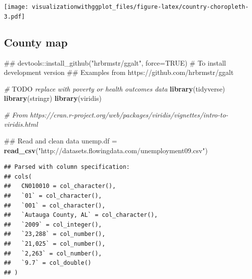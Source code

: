 \documentclass[]{krantz}
\makeatletter
\newenvironment{Shaded}{\begin{snugshade}}{\end{snugshade}}
\newcommand{\KeywordTok}[1]{\textcolor[rgb]{0.13,0.29,0.53}{\textbf{#1}}}
\newcommand{\StringTok}[1]{\textcolor[rgb]{0.31,0.60,0.02}{#1}}
\newcommand{\CommentTok}[1]{\textcolor[rgb]{0.56,0.35,0.01}{\textit{#1}}}
\newcommand{\AlertTok}[1]{\textcolor[rgb]{0.94,0.16,0.16}{#1}}
\newcommand{\NormalTok}[1]{#1}
\newenvironment{kframe}{%
\medskip{}
\setlength{\fboxsep}{.8em}
 \def\at@end@of@kframe{}%
 \ifinner\ifhmode%
  \def\at@end@of@kframe{\end{minipage}}%
  \begin{minipage}{\columnwidth}%
 \fi\fi%
 \def\FrameCommand##1{\hskip\@totalleftmargin \hskip-\fboxsep
 \colorbox{shadecolor}{##1}\hskip-\fboxsep
     \hskip-\linewidth \hskip-\@totalleftmargin \hskip\columnwidth}%
 \MakeFramed {\advance\hsize-\width
   \@totalleftmargin\z@ \linewidth\hsize
   \@setminipage}}%
 {\par\unskip\endMakeFramed%
 \at@end@of@kframe}
\renewenvironment{Shaded}{\begin{kframe}}{\end{kframe}}
\theoremstyle{definition}
\theoremstyle{definition}
\theoremstyle{definition}
\theoremstyle{remark}
\makeatother
\begin{document}
\texttt{[image: visualizationwithggplot\_files/figure-latex/country-choropleth-3.pdf]}

\subsection{County map}\label{county-map}

\begin{Shaded}
\begin{Highlighting}[]
\NormalTok{## devtools::install_github("hrbrmstr/ggalt", force=TRUE) # To install development version}
\NormalTok{## Examples from https://github.com/hrbrmstr/ggalt}

\CommentTok{# }\AlertTok{TODO}\CommentTok{ replace with poverty or health outcomes data}
\KeywordTok{library}\NormalTok{(tidyverse)}
\KeywordTok{library}\NormalTok{(stringr)}
\KeywordTok{library}\NormalTok{(viridis)}


\CommentTok{# From https://cran.r-project.org/web/packages/viridis/vignettes/intro-to-viridis.html}

\NormalTok{## Read and clean data}
\NormalTok{unemp.df =}\StringTok{ }\KeywordTok{read_csv}\NormalTok{(}\StringTok{"http://datasets.flowingdata.com/unemployment09.csv"}\NormalTok{)}
\end{Highlighting}
\end{Shaded}

\begin{verbatim}
## Parsed with column specification:
## cols(
##   CN010010 = col_character(),
##   `01` = col_character(),
##   `001` = col_character(),
##   `Autauga County, AL` = col_character(),
##   `2009` = col_integer(),
##   `23,288` = col_number(),
##   `21,025` = col_number(),
##   `2,263` = col_number(),
##   `9.7` = col_double()
## )
\end{verbatim}
\end{document}
